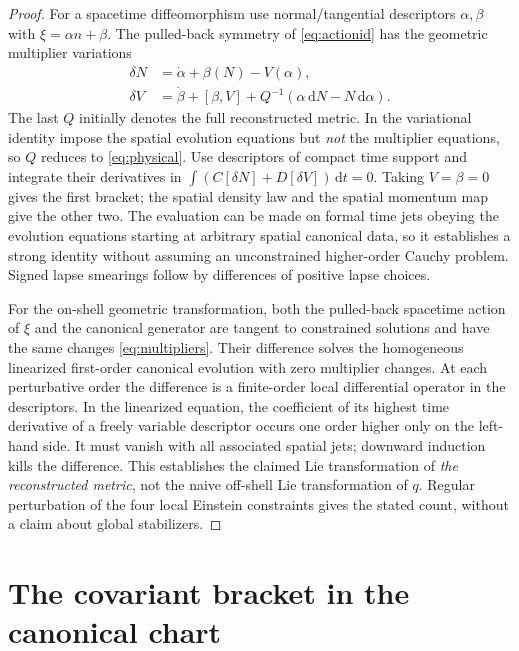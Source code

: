\documentclass[11pt]{article}
\newcommand{\dd}{\mathrm d}
\begin{document}
\begin{proof}
For a spacetime diffeomorphism use normal/tangential descriptors \(\alpha,\beta\) with \(\xi=\alpha n+\beta\). The pulled-back symmetry of \eqref{eq:actionid} has the geometric multiplier variations
\begin{align}
 \delta N&=\dot\alpha+\beta(N)-V(\alpha),\\
 \delta V&=\dot\beta+[\beta,V]+Q^{-1}(\alpha\,\dd N-N\,\dd\alpha).
 \label{eq:multipliers}
\end{align}
The last \(Q\) initially denotes the full reconstructed metric. In the variational identity impose the spatial evolution equations but \emph{not} the multiplier equations, so \(Q\) reduces to \eqref{eq:physical}. Use descriptors of compact time support and integrate their derivatives in
\(\int (C[\delta N]+D[\delta V])\,\dd t=0\). Taking \(V=\beta=0\) gives the first bracket; the spatial density law and the spatial momentum map give the other two. The evaluation can be made on formal time jets obeying the evolution equations starting at arbitrary spatial canonical data, so it establishes a strong identity without assuming an unconstrained higher-order Cauchy problem. Signed lapse smearings follow by differences of positive lapse choices.

For the on-shell geometric transformation, both the pulled-back spacetime action of \(\xi\) and the canonical generator are tangent to constrained solutions and have the same changes \eqref{eq:multipliers}. Their difference solves the homogeneous linearized first-order canonical evolution with zero multiplier changes. At each perturbative order the difference is a finite-order local differential operator in the descriptors. In the linearized equation, the coefficient of its highest time derivative of a freely variable descriptor occurs one order higher only on the left-hand side. It must vanish with all associated spatial jets; downward induction kills the difference. This establishes the claimed Lie transformation of \emph{the reconstructed metric}, not the naive off-shell Lie transformation of \(q\). Regular perturbation of the four local Einstein constraints gives the stated count, without a claim about global stabilizers.
\end{proof}

\section{The covariant bracket in the canonical chart}\label{sec:bracket}
\end{document}
